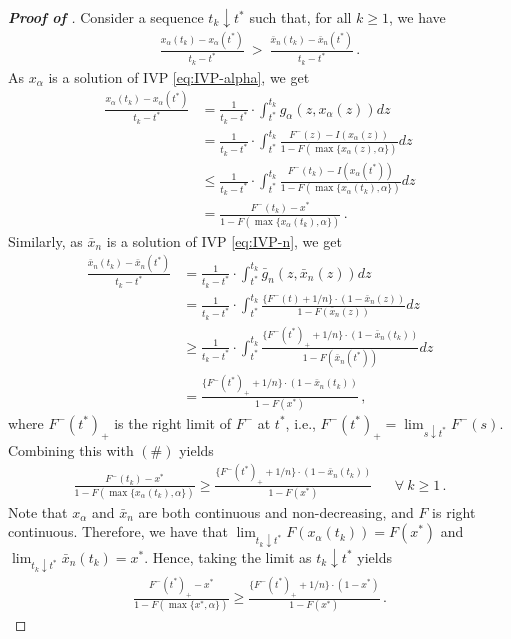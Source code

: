 \begin{proof}[\textbf{Proof of }]
    Consider a sequence $t_k \downarrow t^*$ such that, for all $k \geq 1$, we have
	\begin{align*}
		\frac{x_\alpha(t_k) - x_\alpha(t^*)}{t_k - t^*}\ >\ \frac{\bar x_n(t_k) - \bar x_n(t^*)}{t_k - t^*}\, \tag{\#}.
	\end{align*}
	As $x_\alpha$ is a solution of IVP \eqref{eq:IVP-alpha}, we get
	\begin{align*}
		\frac{x_\alpha(t_k) - x_\alpha(t^*)}{t_k - t^*} &= \frac{1}{t_k - t^*} \cdot \int_{t^*}^{t_k} g_\alpha(z, x_\alpha(z)) dz\\ 
		&= \frac{1}{t_k - t^*} \cdot \int_{t^*}^{t_k} \frac{F^-(z) - I(x_\alpha(z))}{1 - F(\max\{x_\alpha(z), \alpha\})} dz\\
		&\leq \frac{1}{t_k - t^*} \cdot \int_{t^*}^{t_k} \frac{F^-(t_k) - I(x_\alpha(t^*))}{1 - F(\max\{x_\alpha(t_k), \alpha\})} dz\\
		&= \frac{F^-(t_k) - x^*}{1 - F(\max\{x_\alpha(t_k), \alpha\})}\,.
	\end{align*}
	Similarly, as $\bar x_n$ is a solution of IVP \eqref{eq:IVP-n}, we get
	\begin{align*}
		\frac{\bar x_n(t_k) - \bar x_n(t^*)}{t_k - t^*} &= \frac{1}{t_k - t^*} \cdot \int_{t^*}^{t_k} \bar g_n(z, \bar x_n(z)) dz\\
		&= \frac{1}{t_k - t^*} \cdot \int_{t^*}^{t_k} \frac{\{F^-(t) + 1/n\} \cdot  (1 - \bar x_n(z))}{1 - F(\bar x_n(z))} dz\\
		&\geq \frac{1}{t_k - t^*} \cdot \int_{t^*}^{t_k} \frac{\{F^-(t^*)_+ + 1/n\} \cdot  (1 - \bar x_n(t_k))}{1 - F(\bar x_n(t^*))} dz\\
		&= \frac{\{F^-(t^*)_+ + 1/n\} \cdot  (1 - \bar x_n(t_k))}{1 - F(x^*)}\,,
	\end{align*}
	where $F^-(t^*)_+$ is the right limit of $F^-$ at $t^*$, i.e., $F^-(t^*)_+ = \lim_{s \downarrow t^*} F^-(s)$. Combining this with $(\#)$ yields
	\begin{align*}
		\frac{F^-(t_k) - x^*}{1 - F(\max\{x_\alpha(t_k), \alpha\})} \geq \frac{\{F^-(t^*)_+ + 1/n\} \cdot  (1 - \bar x_n(t_k))}{1 - F(x^*)} &&\forall\ k \geq 1\,.
	\end{align*}
	Note that $x_\alpha$ and $\bar x_n$ are both continuous and non-decreasing, and $F$ is right continuous. Therefore, we have that $\lim_{t_k \downarrow t^*} F(x_\alpha(t_k)) = F(x^*)$ and $\lim_{t_k \downarrow t^*} \bar x_n(t_k) = x^*$. Hence, taking the limit as $t_k \downarrow t^*$ yields
	\begin{align*}
		\frac{F^-(t^*)_+ - x^*}{1 - F(\max\{x^*, \alpha\})} \geq \frac{\{F^-(t^*)_+ + 1/n\} \cdot  (1 -  x^*)}{1 - F(x^*)}\,.

\end{align*}
\end{proof}
